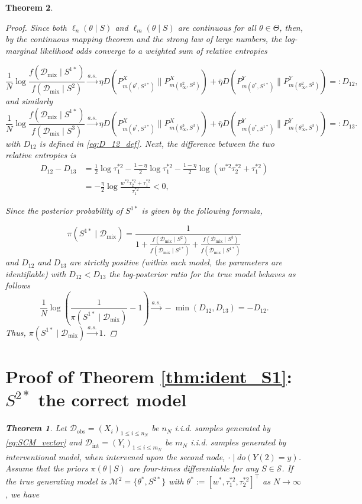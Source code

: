 \documentclass[accepted]{uai2026} %
\newcommand{\train}{\mathcal{D}}
\newcommand{\obsdata}{\train_{\text{obs}}}
\newcommand{\mixdata}{\train_{\text{mix}}}
\newcommand{\tsone}{\tau_1^{*2}}
\newcommand{\tstwo}{\tau_2^{*2}}
\newcommand{\intdata}{\train_{\text{int}}}
\def\transpose{\intercal}
\theoremstyle{boldremark}
\newtheorem{theorem}{Theorem}[section]
\begin{document}
\begin{theorem}
\begin{proof}
Since both $\ell_n(\theta\mid S)$ and $\ell_m(\theta \mid S)$ are continuous for all $\theta\in \Theta$, then, by the continuous mapping theorem and the strong law of large numbers, the log-marginal likelihood odds converge to a weighted sum of relative entropies

    \begin{equation}
        \label{eq:mixture_KL1}
        \frac{1}{N} \log \frac{f(\mixdata \mid S^{1*})}{f(\mixdata \mid S^2)} \xrightarrow{a.s.} \eta D(P_{m(\theta^*, S^{1*})}^X \| P_{m(\theta^2_\infty, S^2)}^X) + \bar{\eta} D(P_{m(\theta^*, S^{1*})}^Y \| P_{m(\theta^2_\infty, S^2)}^Y) =: D_{12},
    \end{equation}
    and similarly
    \begin{equation}
    \label{eq:mixture_KL2}
        \frac{1}{N} \log \frac{f(\mixdata \mid S^{1*})}{f(\mixdata \mid S^3)} \xrightarrow{a.s.} \eta D(P_{m(\theta^*, S^{1*})}^X \| P_{m(\theta^3_\infty, S^3)}^X) + \bar{\eta} D(P_{m(\theta^*, S^{1*})}^Y \| P_{m(\theta^3_\infty, S^3)}^Y) =: D_{13}.
    \end{equation}
    with $D_{12}$ is defined in \eqref{eq:D_12_def}. Next, the difference between the two relative entropies is
    \begin{align*}
        D_{12} - D_{13} &= \frac{1}{2}\log \tau_1^{*2} - \frac{1-\eta}{2}\log \tau_1^{*2} - \frac{1-\eta}{2} \log(w^{*2}\tau_2^{*2} + \tau_1^{*2}) \\
        &= -\frac{\eta}{2} \log \frac{w^{*2}\tau_2^{*2} + \tau_1^{*2}}{\tau_1^{*2}} < 0,
    \end{align*}

    Since the posterior probability of $S^{1*}$ is given by the following formula,

    $$\pi(S^{1*}\mid \mixdata) = \frac{1}{1+\frac{f(\mixdata\mid S^2)}{f(\mixdata\mid S^{1*})}+ \frac{f(\mixdata\mid S^3)}{f(\mixdata\mid S^{1*})}}$$
    and $D_{12}$ and $D_{13}$ are strictly positive (within each model, the parameters are identifiable) with $D_{12}<D_{13}$ the log-posterior ratio for the true model behaves as follows
    \[
        \frac{1}{N} \log \left( \frac{1}{\pi(S^{1*} \mid \mixdata)} - 1 \right) \xrightarrow{a.s.} - \min(D_{12}, D_{13}) = -D_{12}.
    \]
    Thus, $\pi(S^{1*} \mid \mixdata) \xrightarrow{a.s.} 1$.
\end{proof}


\section{Proof of Theorem \ref{thm:ident_S1}: \texorpdfstring{$S^{2*}$}{S2*} the correct model}
\label{appendix:proof_thm2_ident}
\begin{theorem}
Let $\obsdata = (X_i)_{1\leq i \leq n_N}$ be $n_N$ i.i.d. samples generated by \eqref{eq:SCM_vector} and $\intdata = (Y_i)_{1\leq i\leq m_N}$ be $m_N$ i.i.d. samples generated by interventional model, when intervened upon the second node, $\cdot\mid do(Y(2) = y )$. Assume that the priors $\pi(\theta\mid S)$ are four-times differentiable for any $S \in \mathcal{S}$. If the true generating model is $\mathcal{M}^2 = \{\theta^*, S^{2*}\}$ with $\theta^* := [w^*, \tsone, \tstwo]^\transpose$ as $N \to \infty$, we have


\end{theorem}
\end{theorem}
\end{document}
